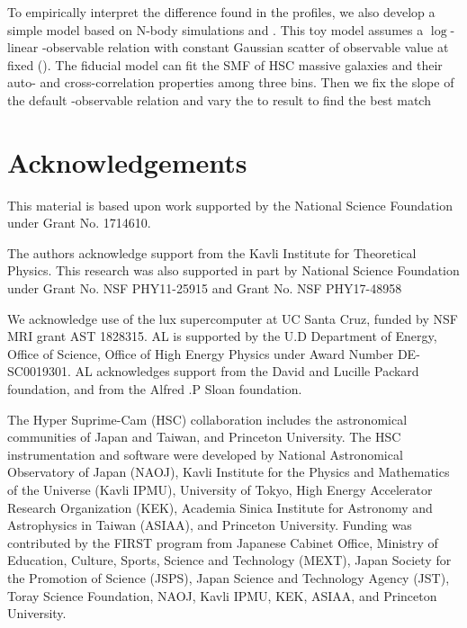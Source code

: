 \documentclass[a4paper,fleqn,usenatbib]{mnras}
\begin{document}




    To empirically interpret the difference found in the \dsigma{} profiles, we also develop 
    a simple model based on N-body simulations  and \smdpl{}. 
    This toy model assumes a $\log$-linear \mvir{}-observable relation with constant Gaussian 
    scatter of observable value at fixed \mvir{} (\scatterObsSymMhalo{}).
    The fiducial model can fit the SMF of HSC massive galaxies and their auto- and cross-correlation
    properties among three \mstar{} bins.
    Then we fix the slope of the default \mvir{}-observable relation and vary the 
    \scatterObsSymMhalo{} to result
    to find the best match  


\section*{Acknowledgements}


  This material is based upon work supported by the National Science Foundation under 
  Grant No. 1714610. 
  
  The authors acknowledge support from the Kavli Institute for Theoretical Physics.
  This research was also supported in part by National Science Foundation under Grant 
  No. NSF PHY11-25915 and Grant No. NSF PHY17-48958
  
  We acknowledge use of the lux supercomputer at UC Santa Cruz, funded by NSF MRI grant AST
  1828315. AL is supported by the U.D Department of Energy, Office of Science, Office of High
  Energy Physics under Award Number DE-SC0019301. AL acknowledges support from the David and
  Lucille Packard foundation, and from the Alfred .P Sloan foundation.

  The Hyper Suprime-Cam (HSC) collaboration includes the astronomical communities of 
  Japan and Taiwan, and Princeton University.  The HSC instrumentation and software were
  developed by National Astronomical Observatory of Japan (NAOJ), Kavli Institute
  for the Physics and Mathematics of the Universe (Kavli IPMU), University of Tokyo,
  High Energy Accelerator Research Organization (KEK), Academia Sinica Institute
  for Astronomy and Astrophysics in Taiwan (ASIAA), and Princeton University.  
  Funding was contributed by the FIRST program from Japanese Cabinet Office,  Ministry 
  of Education, Culture, Sports, Science and Technology (MEXT), Japan Society for 
  the Promotion of Science (JSPS), Japan Science and Technology Agency (JST), Toray 
  Science Foundation, NAOJ, Kavli IPMU, KEK, ASIAA, and Princeton University.
   
\end{document}
